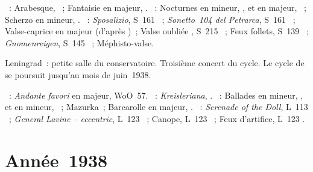 \begin{description}
 \textsc{\Schumann{}}~: Arabesque, ~; Fantaisie en \kC majeur,
 .
 \textsc{\Chopin{}}~: Nocturnes en \kC mineur,  , et en
 \kF majeur,  ~; Scherzo en \kB mineur, .
 \textsc{\Liszt{}}~: \emph{Sposalizio}, S~161 ~; \emph{Sonetto~104
 del Petrarca}, S~161 ~; Valse-caprice en \kA \Flat majeur
 (d'après \Schubert{})~; Valse oubliée , S~215 ~; Feux
 follets, S~139 ~; \emph{Gnomenreigen}, S~145 ~;
 Méphisto-valse.
 \item[\DateWithWeekDay{1937-12-23}]
 Leningrad~: petite salle du conservatoire.
 Troisième concert du cycle.
 Le cycle de \VSofronitsky{} se poursuit jusqu'au mois de juin~1938.

 \textsc{\Beethoven{}}~: \emph{Andante favori} en \kF majeur, WoO~57.
 \textsc{\Schumann{}}~: \emph{Kreisleriana}, .
 \textsc{\Chopin{}}~: Ballades en \kG mineur, , et en \kF mineur,
 ~; Mazurka~; Barcarolle en \kF \Sharp majeur, .
 \textsc{\Debussy{}}~: \emph{Serenade of the Doll}, L~113 ~;
 \emph{General Lavine -- eccentric}, L~123 ~; Canope, L~123
 ~; Feux d'artifice, L~123 .
\end{description}

\section{Année~1938}

